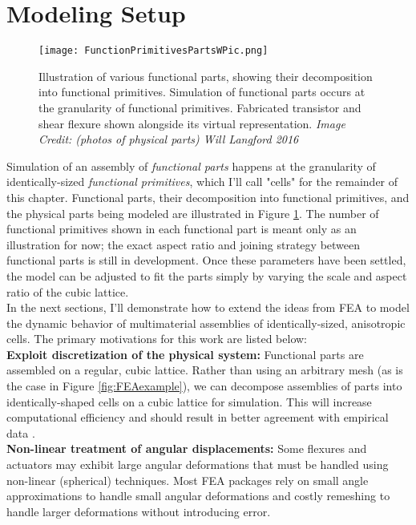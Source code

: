 {\section{Modeling Setup}

\begin{figure}
  \texttt{[image: FunctionPrimitivesPartsWPic.png]}
  \caption{Illustration of various functional parts, showing their decomposition into functional primitives.  Simulation of functional parts occurs at the granularity of functional primitives.  Fabricated transistor and shear flexure shown alongside its virtual representation.  \textit{Image Credit: (photos of physical parts) Will Langford 2016}}
  \label{fig:FunctionPrimitivesPartsWPic}
\end{figure}

Simulation of an assembly of \textit{functional parts} happens at the granularity of identically-sized \textit{functional primitives}, which I'll call "cells" for the remainder of this chapter.  Functional parts, their decomposition into functional primitives, and the physical parts being modeled are illustrated in Figure \ref{fig:FunctionPrimitivesPartsWPic}.  The number of functional primitives shown in each functional part is meant only as an illustration for now; the exact aspect ratio and joining strategy between functional parts is still in development.  Once these parameters have been settled, the model can be adjusted to fit the parts simply by varying the scale and aspect ratio of the cubic lattice.\\

In the next sections, I'll demonstrate how to extend the ideas from FEA to model the dynamic behavior of multimaterial assemblies of identically-sized, anisotropic cells.  The primary motivations for this work are listed below:\\

\textbf{Exploit discretization of the physical system:} Functional parts are assembled on a regular, cubic lattice.  Rather than using an arbitrary mesh (as is the case in Figure \ref{fig:FEAexample}), we can decompose assemblies of parts into identically-shaped cells on a cubic lattice for simulation.  This will increase computational efficiency and should result in better agreement with empirical data \cite{Calisch2014}.\\

\textbf{Non-linear treatment of angular displacements:} Some flexures and actuators may exhibit large angular deformations that must be handled using non-linear (spherical) techniques.  Most FEA packages rely on small angle approximations to handle small angular deformations and costly remeshing to handle larger deformations without introducing error.\\

}
